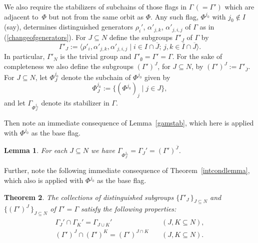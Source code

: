 \documentclass[12pt]{article}
\renewcommand{\bar}{\overline}
\renewcommand{\>}{\rangle}
\newtheorem{theorem}{Theorem}[section]
\newtheorem{lemma}[theorem]{Lemma}
\theoremstyle{definition}\newtheorem{definition}{Definition}[section]
\begin{document}
We also require the stabilizers of subchains of those flags in $\Gamma\,(=\Gamma')$ which are adjacent to~$\Phi$ but not from the same orbit as $\Phi$. Any such flag, $\Phi^{j_0}$ with $j_0 \notin I$ (say), determines distinguished generators $\rho_i'$, $\alpha'_{j,k}$, $\alpha'_{j,i,j}$ of $\Gamma$ as in (\ref{changeofgenerators}). For $J \subseteq N$ define the subgroups $\Gamma'_J$ of $\Gamma$ by 
\begin{equation}
\label{gamjprime}
\Gamma'_J:=
\langle \rho'_i, \alpha'_{j,k},  \alpha'_{j,i,j} \mid i \in I \cap \bar{J}; \, j,k \in \bar{I} \cap \bar{J} \rangle.
\end{equation} 
In particular, $\Gamma'_N$ is the trivial group and $\Gamma'_{\emptyset}=\Gamma'=\Gamma$.  For the sake of completeness we also define the subgroups $(\Gamma')^J$, for $J \subseteq N$, by $(\Gamma')^J:=\Gamma'_{\bar{J}}$. For $J\subseteq N$, let $\Phi^{j_0}_J$ denote the subchain of $\Phi^{j_0}$ given by 
\[\Phi^{j_0}_J:=\{(\Phi^{j_0})_{j}\mid j\in J\},\] 
and let $\Gamma_{\Phi^{j_0}_J}$ denote its stabilizer in $\Gamma$. 

Then note an immediate consequence of Lemma~\ref{gamstab}, which here is applied with $\Phi^{j_0}$ as the base flag. 

\begin{lemma}
\label{gamprimestabs}
For each $J\subseteq N$ we have $\Gamma_{\Phi^{j_0}_J}=\Gamma_{J}'=(\Gamma')^{\bar{J}}$.
\end{lemma}

Further, note the following immediate consequence of Theorem~\ref{intcondlemma}, which also is applied with $\Phi^{j_0}$ as the base flag. 

\begin{theorem}
\label{intcondlemmaprime}
The collections of distinguished subgroups $\big\{\Gamma'_{J}\!\,\big\}_{\!J\subseteq N}$ and $\big\{(\Gamma')^{J}\!\,\big\}_{\!J\subseteq N}$ of $\Gamma'=\Gamma$ satisfy the following properties:
\begin{eqnarray}
\label{intcondprime}
\begin{array}{ll}
\Gamma_{J}' \cap \Gamma_{K}' = \Gamma_{J\cup K}' &\quad (J,K \subseteq N),\\[.1in]
(\Gamma')^{J} \cap (\Gamma')^{K} = (\Gamma')^{J\cap K} &\quad (J,K \subseteq N).
\end{array}
\end{eqnarray}
\end{theorem}
\bigskip
\end{document}
